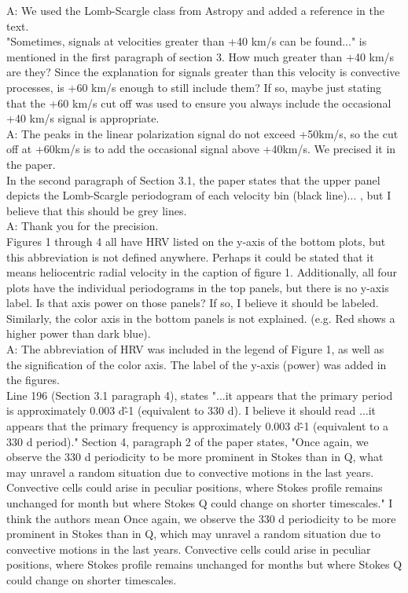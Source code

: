 \documentclass{article}
\begin{document}
A: We used the Lomb-Scargle class from Astropy and added a reference in the text.\\ 

"Sometimes, signals at velocities greater than +40 km/s can be found..." is mentioned in the first paragraph of section 3. How much greater than +40 km/s are they? Since the explanation for
signals greater than this velocity is convective processes, is +60 km/s enough to still include
them? If so, maybe just stating that the +60 km/s cut off was used to ensure you always include
the occasional +40 km/s signal is appropriate.\\

A: The peaks in the linear polarization signal do not exceed +50km/s, so the cut off at +60km/s is to add the occasional signal above +40km/s. We precised it in the paper. \\

In the second paragraph of Section 3.1, the paper states that the upper panel depicts the
Lomb-Scargle periodogram of each velocity bin (black line)... , but I believe that this should be
grey lines.\\

A: Thank you for the precision. \\

Figures 1 through 4 all have HRV listed on the y-axis of the bottom plots, but this abbreviation is not defined anywhere. Perhaps it could be stated that it means heliocentric radial velocity in the
caption of figure 1. Additionally, all four plots have the individual periodograms in the top panels,
but there is no y-axis label. Is that axis power on those panels? If so, I believe it should be labeled. Similarly, the color axis in the bottom panels is not explained. (e.g. Red shows a higher power than dark blue).\\

A: The abbreviation of HRV was included in the legend of Figure 1, as well as the signification of the color axis. The label of the y-axis (power) was added in the figures.\\

Line 196 (Section 3.1 paragraph 4), states "...it appears that the primary period is approximately 0.003 d\^-1 (equivalent to 330 d). I believe it should read ...it appears that the primary frequency is approximately 0.003 d\^-1 (equivalent to a 330 d period)." Section 4, paragraph 2 of the paper states, "Once again, we observe the 330 d periodicity to be more prominent in Stokes than in Q, what may unravel a random situation due to convective motions in the last years. Convective cells could arise in peculiar positions, where Stokes profile remains unchanged for month but where Stokes Q could change on shorter timescales." I think the authors mean Once again, we observe the 330 d periodicity to be more prominent in Stokes than in Q, which may unravel a random situation due to convective motions in the last years. Convective cells could arise in peculiar positions, where Stokes profile remains unchanged for months but where Stokes Q could change on shorter timescales.\\
\end{document}
